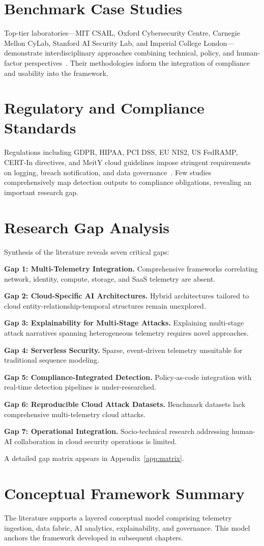 \section{Benchmark Case Studies}
Top-tier laboratories---MIT CSAIL, Oxford Cybersecurity Centre, Carnegie Mellon CyLab, Stanford AI Security Lab, and Imperial College London---demonstrate interdisciplinary approaches combining technical, policy, and human-factor perspectives~\cite{mitcsail2023,oxfordcyber2022,cylab2021}. Their methodologies inform the integration of compliance and usability into the framework.

\section{Regulatory and Compliance Standards}
Regulations including GDPR, HIPAA, PCI DSS, EU NIS2, US FedRAMP, CERT-In directives, and MeitY cloud guidelines impose stringent requirements on logging, breach notification, and data governance~\cite{gdpr2016,hipaa2013,nis22022,fedramp2023,certin2022directive,meity2017cloud}. Few studies comprehensively map detection outputs to compliance obligations, revealing an important research gap.

\section{Research Gap Analysis}\label{sec:lit-gaps}
Synthesis of the literature reveals seven critical gaps:

\textbf{Gap 1: Multi-Telemetry Integration.} Comprehensive frameworks correlating network, identity, compute, storage, and SaaS telemetry are absent.

\textbf{Gap 2: Cloud-Specific AI Architectures.} Hybrid architectures tailored to cloud entity-relationship-temporal structures remain unexplored.

\textbf{Gap 3: Explainability for Multi-Stage Attacks.} Explaining multi-stage attack narratives spanning heterogeneous telemetry requires novel approaches.

\textbf{Gap 4: Serverless Security.} Sparse, event-driven telemetry unsuitable for traditional sequence modeling.

\textbf{Gap 5: Compliance-Integrated Detection.} Policy-as-code integration with real-time detection pipelines is under-researched.

\textbf{Gap 6: Reproducible Cloud Attack Datasets.} Benchmark datasets lack comprehensive multi-telemetry cloud attacks.

\textbf{Gap 7: Operational Integration.} Socio-technical research addressing human-AI collaboration in cloud security operations is limited.

A detailed gap matrix appears in Appendix~\ref{app:matrix}.

\section{Conceptual Framework Summary}
The literature supports a layered conceptual model comprising telemetry ingestion, data fabric, AI analytics, explainability, and governance. This model anchors the framework developed in subsequent chapters.
